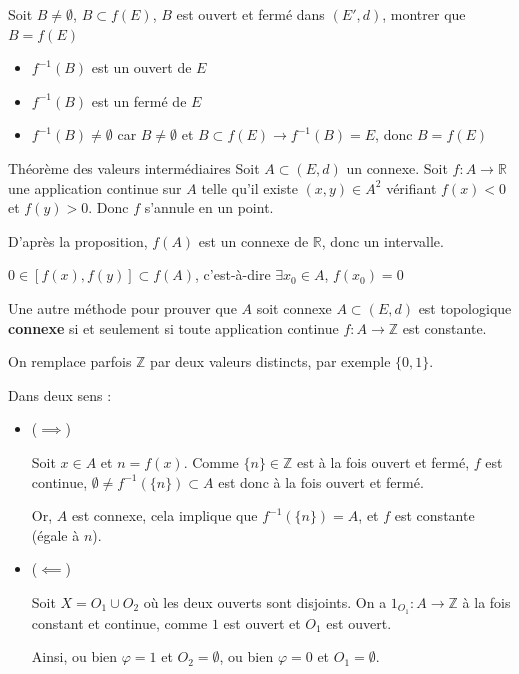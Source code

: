 \begin{myproof}
Soit $B \ne \emptyset$,  $B \subset f(E)$, $B$ est ouvert et fermé dans $(E',d)$, montrer que  $B = f(E)$
 \begin{itemize}
     \item $f^{-1}(B)$ est un ouvert de $E$
     \item  $f^{-1}(B)$ est un fermé de $E$
     \item  $f^{-1}(B) \ne \emptyset$ car $B \ne \emptyset$ et  $B \subset f(E) \to f^{-1}(B)=E$, donc $B = f(E)$
\end{itemize}
\end{myproof}

\begin{Example}{Théorème des valeurs intermédiaires}{}
Soit $A\subset (E,d)$ un connexe. Soit $f:A \to \mathbb{R}$ une application continue sur $A$ telle qu'il existe $(x,y)\in A^2$ vérifiant $f(x)<0$ et $f(y)>0$. Donc $f$ s'annule en un point.
\end{Example}

\begin{myproof}
D'après la proposition, $f(A)$ est un connexe de $\mathbb{R}$, donc un intervalle.

$0 \in [f(x), f(y)] \subset f(A)$, c'est-à-dire $\exists x_0 \in A$, $f(x_0)=0$
\end{myproof}


\begin{Prop}{Une autre méthode pour prouver que $A$ soit connexe}{}
$A \subset (E,d)$ est topologique \textbf{connexe} si et seulement si toute application continue $f : A \to \mathbb{Z} $ est constante.

On remplace parfois $\mathbb{Z}$ par deux valeurs distincts, par exemple $\{0,1\}$.
\end{Prop}

\begin{myproof} Dans deux sens :
    \begin{itemize}
        \item ($\implies$)

            Soit $x \in A$ et  $n = f(x)$. Comme  $\{n\}\in \mathbb{Z}$ est à la fois ouvert et fermé, $f$ est continue, $\emptyset \ne f^{-1}(\{n\}) \subset A$ est donc à la fois ouvert et fermé.

            Or, $A$ est connexe, cela implique que  $f^{-1}(\{n\}) = A$, et $f$ est constante (égale à $n$).

        \item ($\impliedby$)

            Soit $X = O_1 \cup O_2$ où les deux ouverts sont disjoints. On a $1_{O_1}: A \to \mathbb{Z} $ à la fois constant et continue, comme $1$ est ouvert et $O_1$ est ouvert.

            Ainsi, ou bien  $\varphi =1$ et  $O_2 = \emptyset$, ou bien  $\varphi = 0$ et  $O_1 = \emptyset$.


    \end{itemize}
\end{myproof}

